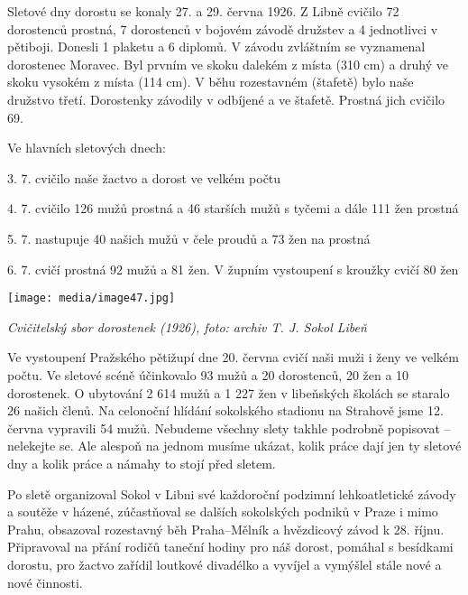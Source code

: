 Sletové dny dorostu se konaly 27. a 29. června 1926. Z Libně cvičilo 72
dorostenců prostná, 7 dorostenců v bojovém závodě družstev a 4
jednotlivci v pětiboji. Donesli 1 plaketu a 6 diplomů. V závodu
zvláštním se vyznamenal dorostenec Moravec. Byl prvním ve skoku dalekém
z místa (310 cm) a druhý ve skoku vysokém z místa (114 cm). V běhu
rozestavném (štafetě) bylo naše družstvo třetí. Dorostenky závodily v
odbíjené a ve štafetě. Prostná jich cvičilo 69.

Ve hlavních sletových dnech:

3. 7. cvičilo naše žactvo a dorost ve velkém počtu

4. 7. cvičilo 126 mužů prostná a 46 starších mužů s tyčemi a dále 111
žen prostná

5. 7. nastupuje 40 našich mužů v čele proudů a 73 žen na prostná

6. 7. cvičí prostná 92 mužů a 81 žen. V župním vystoupení s kroužky
cvičí 80 žen

\texttt{[image: media/image47.jpg]}

\emph{Cvičitelský sbor dorostenek (1926), foto: archiv T. J. Sokol
Libeň}

Ve vystoupení Pražského pětižupí dne 20. června cvičí naši muži i ženy
ve velkém počtu. Ve sletové scéně účinkovalo 93 mužů a 20 dorostenců, 20
žen a 10 dorostenek. O ubytování 2 614 mužů a 1 227 žen v libeňských
školách se staralo 26 našich členů. Na celonoční hlídání sokolského
stadionu na Strahově jsme 12. června vypravili 54 mužů. Nebudeme všechny
slety takhle podrobně popisovat -- nelekejte se. Ale alespoň na jednom
musíme ukázat, kolik práce dají jen ty sletové dny a kolik práce a
námahy to stojí před sletem.

Po sletě organizoval Sokol v Libni své každoroční podzimní
lehkoatletické závody a soutěže v házené, zúčastňoval se dalších
sokolských podniků v Praze i mimo Prahu, obsazoval rozestavný běh
Praha--Mělník a hvězdicový závod k 28. říjnu. Připravoval na přání
rodičů taneční hodiny pro náš dorost, pomáhal s besídkami dorostu, pro
žactvo zařídil loutkové divadélko a vyvíjel a vymýšlel stále nové a nové
činnosti.

